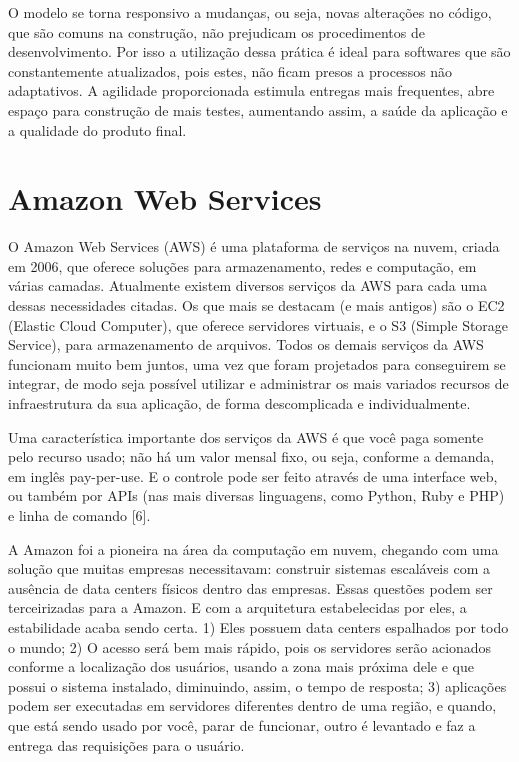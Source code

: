 O modelo se torna responsivo a mudanças, ou seja, novas alterações no código, que são comuns na construção, não prejudicam os procedimentos de desenvolvimento. Por isso a utilização dessa prática é ideal para softwares que são constantemente atualizados, pois estes, não ficam presos a processos não adaptativos. A agilidade proporcionada estimula entregas mais frequentes, abre espaço para construção de mais testes, aumentando assim, a saúde da aplicação e a qualidade do produto final.

\section{Amazon Web Services}

O Amazon Web Services (AWS) é uma plataforma de serviços na nuvem, criada em 2006, que oferece soluções para armazenamento, redes e computação, em várias camadas. Atualmente existem diversos serviços da AWS para cada uma dessas necessidades citadas. Os que mais se destacam (e mais antigos) são o EC2 (Elastic Cloud Computer), que oferece servidores virtuais, e o S3 (Simple Storage Service), para armazenamento de arquivos. Todos os demais serviços da AWS funcionam muito bem juntos, uma vez que foram projetados para conseguirem se integrar, de modo seja possível utilizar e administrar os mais variados recursos de infraestrutura da sua aplicação, de forma descomplicada e individualmente.

Uma característica importante dos serviços da AWS é que você paga somente pelo recurso usado; não há um valor mensal fixo, ou seja, conforme a demanda, em inglês pay-per-use. E o controle pode ser feito através de uma interface web, ou também por APIs (nas mais diversas linguagens, como Python, Ruby e PHP) e linha de comando [6].

A Amazon foi a pioneira na área da computação em nuvem, chegando com uma solução que muitas empresas necessitavam: construir sistemas escaláveis com a ausência de data centers físicos dentro das empresas. Essas questões podem ser terceirizadas para a Amazon. E com a arquitetura estabelecidas por eles, a estabilidade acaba sendo certa. 1) Eles possuem data centers espalhados por todo o mundo; 2) O acesso será bem mais rápido, pois os servidores serão acionados conforme a localização dos usuários, usando a zona mais próxima dele e que possui o sistema instalado, diminuindo, assim, o tempo de resposta; 3) aplicações podem ser executadas em servidores diferentes dentro de uma região, e quando, que está sendo usado por você, parar de funcionar, outro é levantado e faz a entrega das requisições para o usuário.

